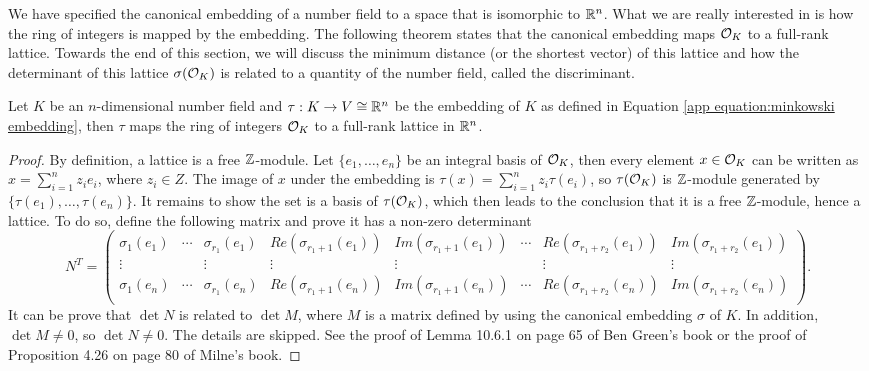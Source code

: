 \documentclass[../main.tex]{subfiles}
\begin{document}
We have specified the canonical embedding of a number field to a space that is isomorphic to $\mathbb{R}^n$. What we are really interested in is how the ring of integers is mapped by the embedding. The following theorem states that the canonical embedding maps $\mathcal{O}_K$ to a full-rank lattice. Towards the end of this section, we will discuss the minimum distance (or the shortest vector) of this lattice and how the determinant of this lattice $\sigma(\mathcal{O}_K)$ is related to a quantity of the number field, called the discriminant.

\begin{theorem}
\label{app thm:rngIntLat}
\reversemarginpar
{}
Let $K$ be an $n$-dimensional number field and $\tau: K \rightarrow V \cong \mathbb{R}^n$ be the embedding of $K$ as defined in Equation \ref{app equation:minkowski embedding}, then $\tau$ maps the ring of integers $\mathcal{O}_K$ to a full-rank lattice in $\mathbb{R}^n$. 
\end{theorem}

\begin{proof}
By definition, a lattice is a free $\mathbb{Z}$-module. Let $\{e_1,\dots,e_n\}$ be an integral basis of $\mathcal{O}_K$, then every element $x \in \mathcal{O}_K$ can be written as $x=\sum_{i=1}^n z_i e_i$, where $z_i \in Z$. The image of $x$ under the embedding is $\tau(x)=\sum_{i=1}^n z_i \tau(e_i)$, so $\tau(\mathcal{O}_K)$ is $\mathbb{Z}$-module generated by $\{\tau(e_1),\dots,\tau(e_n)\}$. It remains to show the set is a basis of $\tau(\mathcal{O}_K)$, which then leads to the conclusion that it is a free $\mathbb{Z}$-module, hence a lattice. To do so, define the following matrix and prove it has a non-zero determinant
\begin{equation*}
N^T = \left(
\begin{smallmatrix}
\sigma_1(e_1) & \cdots & \sigma_{r_1}(e_1) & Re(\sigma_{r_1+1}(e_1)) & Im(\sigma_{r_1+1}(e_1)) & \cdots & Re(\sigma_{r_1+r_2}(e_1)) & Im(\sigma_{r_1+r_2}(e_1)) \\
\vdots & & \vdots & \vdots & \vdots & & \vdots & \vdots \\
\sigma_1(e_n) & \cdots & \sigma_{r_1}(e_n) & Re(\sigma_{r_1+1}(e_n)) & Im(\sigma_{r_1+1}(e_n)) & \cdots & Re(\sigma_{r_1+r_2}(e_n)) & Im(\sigma_{r_1+r_2}(e_n)) \\
\end{smallmatrix}
\right).
\end{equation*}
It can be prove that $\det N $ is related to $\det M$, where $M$ is a matrix defined by using the canonical embedding $\sigma$ of $K$. In addition, $\det M \neq 0$, so $\det N \neq 0$. The details are skipped. See the proof of Lemma 10.6.1 on page 65 of Ben Green's book or the proof of Proposition 4.26 on page 80 of Milne's book. 
\end{proof}
\end{document}
